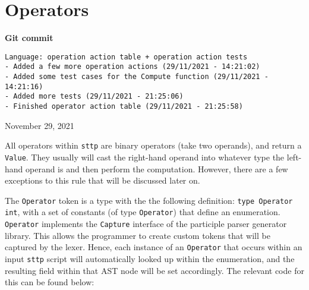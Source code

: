 \section{Operators}
\label{sec:development-operators}

\begin{center}
    \textbf{Git commit}
    \begin{verbatim}
Language: operation action table + operation action tests
- Added a few more operation actions (29/11/2021 - 14:21:02)
- Added some test cases for the Compute function (29/11/2021 - 14:21:16)
- Added more tests (29/11/2021 - 21:25:06)
- Finished operator action table (29/11/2021 - 21:25:58)
    \end{verbatim}
    \vspace{-1em}
    \tiny{November 29, 2021}
\end{center}

All operators within \verb|sttp| are binary operators (take two operands), and return a \verb|Value|. They usually will cast the right-hand operand into whatever type the left-hand operand is and then perform the computation. However, there are a few exceptions to this rule that will be discussed later on.

The \verb|Operator| token is a type with the the following definition: \texttt{type Operator int}, with a set of constants (of type \verb|Operator|) that define an enumeration. \verb|Operator| implements the \verb|Capture| interface of the participle parser generator library. This allows the programmer to create custom tokens that will be captured by the lexer. Hence, each instance of an \verb|Operator| that occurs within an input \verb|sttp| script will automatically looked up within the enumeration, and the resulting field within that AST node will be set accordingly. The relevant code for this can be found below:

\inputminted[firstline=13, lastline=71, autogobble, breaklines, tabsize=4]{go}{../../src/eval/operators.go}

